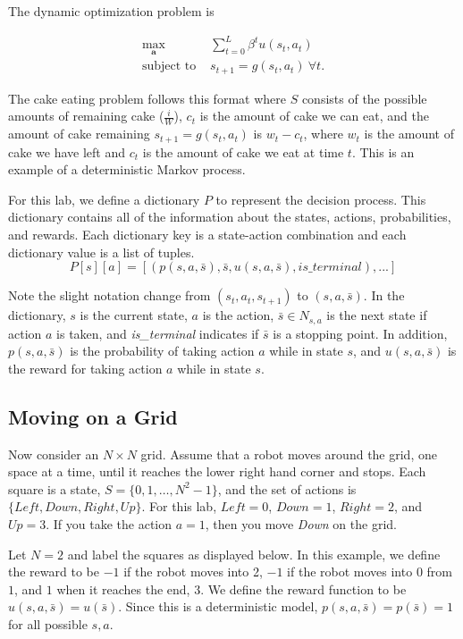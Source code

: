 The dynamic optimization problem is

\begin{align}
\label{eq:policyiter-dynopt1}
\max_\mathbf{a}  & \sum_{t=0}^{L} \beta^t u(s_t,a_t) \\
\mbox{subject to } & s_{t+1}= g(s_t,a_t)\ \forall t.
\end{align}

The cake eating problem follows this format where $S$ consists of the possible amounts of remaining cake ($\frac{i}{W}$), $c_t$ is the amount of cake we can eat, and the amount of cake remaining $s_{t+1}=g(s_t,a_t)$ is $w_t-c_t$, where $w_t$ is the amount of cake we have left and $c_t$ is the amount of cake we eat at time $t$. 
This is an example of a deterministic Markov process.

For this lab, we define a dictionary $P$ to represent the decision process.
This dictionary contains all of the information about the states, actions, probabilities, and rewards.
Each dictionary key is a state-action combination and each dictionary value is a list of tuples.
\[P[s][a]=[(p(s,a,\bar{s}), \bar{s}, u(s,a,\bar{s}), is\_terminal),...]\]

Note the slight notation change from $(s_t,a_t,s_{t+1})$ to $(s,a,\bar{s})$. In the dictionary, $s$ is the current state, $a$ is the action, $\bar{s}\in N_{s,a}$ is the next state if action $a$ is taken, and \emph{is\_terminal} indicates if $\bar{s}$ is a stopping point.
In addition, $p(s,a,\bar{s}) $ is the probability of taking action $a$ while in state $s$, and $u(s,a,\bar{s})$ is the reward for taking action $a$ while in state $s$.

\subsection*{Moving on a Grid}

Now consider an $N \times N$ grid.
Assume that a robot moves around the grid, one space at a time, until it reaches the lower right hand corner and stops.
Each square is a state, $S = \{0, 1, \ldots, N^2-1\}$, and the set of actions is $\{Left, Down, Right, Up\}$.
For this lab, $Left = 0$, $Down = 1$, $Right = 2$, and $Up = 3$.
If you take the action $a = 1$, then you move \emph{Down} on the grid.

Let $N=2$ and label the squares as displayed below.
In this example, we define the reward to be $-1$ if the robot moves into 2, $-1$ if the robot moves into $0$ from $1$, and $1$ when it reaches the end, $3$.
We define the reward function to be $u(s,a,\bar{s}) = u(\bar{s})$.
Since this is a deterministic model, $p(s,a,\bar{s}) = p(\bar{s}) = 1$ for all possible $s,a$.


